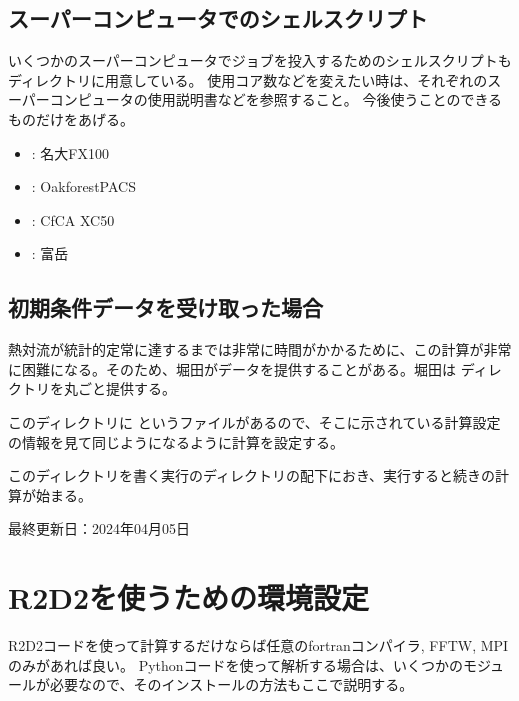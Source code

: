 \documentclass[letterpaper,10pt,dvipdfmx,report]{sphinxmanual}
\begin{document}
\section{スーパーコンピュータでのシェルスクリプト}
\label{\detokenize{start:id5}}
\sphinxAtStartPar
いくつかのスーパーコンピュータでジョブを投入するためのシェルスクリプトも  ディレクトリに用意している。
使用コア数などを変えたい時は、それぞれのスーパーコンピュータの使用説明書などを参照すること。
今後使うことのできるものだけをあげる。
\begin{itemize}
\item {} 
\sphinxAtStartPar
{} : 名大FX100

\item {} 
\sphinxAtStartPar
{} : Oakforest\sphinxhyphen{}PACS

\item {} 
\sphinxAtStartPar
{} : CfCA XC50

\item {} 
\sphinxAtStartPar
{} : 富岳

\end{itemize}


\section{初期条件データを受け取った場合}
\label{\detokenize{start:id6}}
\sphinxAtStartPar
熱対流が統計的定常に達するまでは非常に時間がかかるために、この計算が非常に困難になる。そのため、堀田がデータを提供することがある。堀田は  ディレクトリを丸ごと提供する。

\sphinxAtStartPar
このディレクトリに  というファイルがあるので、そこに示されている計算設定の情報を見て同じようになるように計算を設定する。

\sphinxAtStartPar
このディレクトリを書く実行のディレクトリの配下におき、実行すると続きの計算が始まる。

\sphinxAtStartPar
最終更新日：2024年04月05日

\sphinxstepscope


\chapter{R2D2を使うための環境設定}
\label{\detokenize{environment:r2d2}}\label{\detokenize{environment::doc}}
\sphinxAtStartPar
R2D2コードを使って計算するだけならば任意のfortranコンパイラ, FFTW, MPIのみがあれば良い。
Pythonコードを使って解析する場合は、いくつかのモジュールが必要なので、そのインストールの方法もここで説明する。
\end{document}
